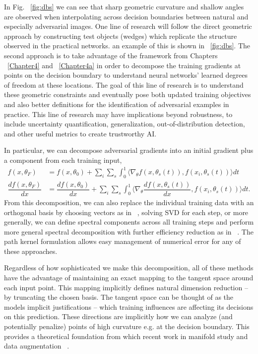In Fig. ~\ref{fig:dbs} we can see that sharp geometric curvature
and shallow angles are observed when interpolating across decision
boundaries between natural and especially adversarial images. One line
of research will follow the direct geometric approach by constructing
test objects (wedges) which replicate the structure observed in the
practical networks. an example of this is shown in ~\ref{fig:dbs}. The
second approach is to take advantage of the framework from Chapters
~\ref{Chapter4} and ~\ref{Chapter4a} in order to decompose the
training gradients at points on the decision boundary to understand
neural networks' learned degrees of freedom at these locations. The
goal of this line of research is to understand these geometric
constraints and eventually pose both updated training objectives and
also better definitions for the identification of adversarial examples
in practice. This line of research may have implications beyond
robustness, to include uncertainty quantification, generalization,
out-of-distribution detection, and other useful metrics to create
trustworthy AI.

In particular, we can decompose adversarial gradients into an
initial gradient plus a component from each training input,
\begin{align}
  f(x, \theta_F) &= f(x, \theta_0) + \sum_i \sum_s \int_0^1 \langle
  \nabla_\theta f(x, \theta_s(t)), f(x_i, \theta_s(t))\rangle dt \\
  \dfrac{d f(x, \theta_F)}{dx} &= \dfrac{d f(x, \theta_0)}{dx} + \sum_i \sum_s \int_0^1 \langle
  \nabla_\theta \dfrac{d f(x, \theta_s(t))}{dx}, f(x_i,
                                 \theta_s(t))\rangle dt.
\end{align}
From this decomposition, we can also replace the individual training
data with an orthogonal basis by choosing vectors as in
~\citet{halko2011finding}, solving SVD for each step, or more
generally, we can define spectral components across all training steps
and perform more general spectral decomposition with further
efficiency reduction as in ~\citet{tancik2020fourierfeatures}. The path kernel
formulation allows easy management of numerical error for any of these
approaches. 

Regardless of how sophisticated we make this decomposition, all of
these methods have the advantage of maintaining an exact mapping to
the tangent space around each input point. This mapping implicitly
defines natural dimension reduction -- by truncating the chosen
basis. The tangent space can be thought of as the models implicit
justifications -- which training influences are affecting its
decisions on this prediction. These directions are implicitly how we
can analyze (and potentially penalize) points of high curvature
e.g. at the decision boundary. This provides a theoretical foundation
from which recent work in manifold study and data augmentation
~\citep{kaufman_data_2023, liu_linear_2023, sipka_differentiable_2023,
  cha_orthogonality-enforced_2023, marbut_reliable_2023,
  gao_out--domain_2023, oh_provable_2023, chen2023aware}.


